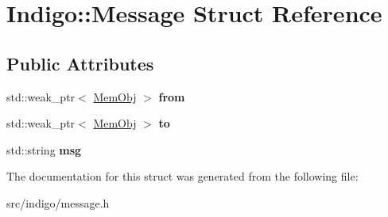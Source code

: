 \hypertarget{struct_indigo_1_1_message}{}\section{Indigo\+:\+:Message Struct Reference}
\label{struct_indigo_1_1_message}
\subsection*{Public Attributes}
\begin{DoxyCompactItemize}
\item 
\mbox{\label{struct_indigo_1_1_message_a8c6243e6147e6adb9e550dab5544746d}} 
std\+::weak\+\_\+ptr$<$ \hyperlink{class_indigo_1_1_mem_obj}{Mem\+Obj} $>$ {\bfseries from}
\item 
\mbox{\label{struct_indigo_1_1_message_aefdd64f0fa7ce7f8fa955ce9242b82de}} 
std\+::weak\+\_\+ptr$<$ \hyperlink{class_indigo_1_1_mem_obj}{Mem\+Obj} $>$ {\bfseries to}
\item 
\mbox{\label{struct_indigo_1_1_message_aca5d32719ecc9366f536d9947273f36e}} 
std\+::string {\bfseries msg}
\end{DoxyCompactItemize}


The documentation for this struct was generated from the following file\+:\begin{DoxyCompactItemize}
\item 
src/indigo/message.\+h\end{DoxyCompactItemize}
